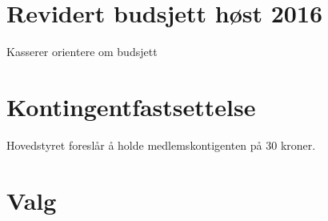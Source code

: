 \documentclass[10pt,norsk,a4paper]{article}
\begin{document}
\section{Revidert budsjett høst 2016}
Kasserer orientere om budsjett\\



\section{Kontingentfastsettelse}
Hovedstyret foreslår å holde medlemskontigenten på 30 kroner.\\

\section{Valg}
\end{document}
